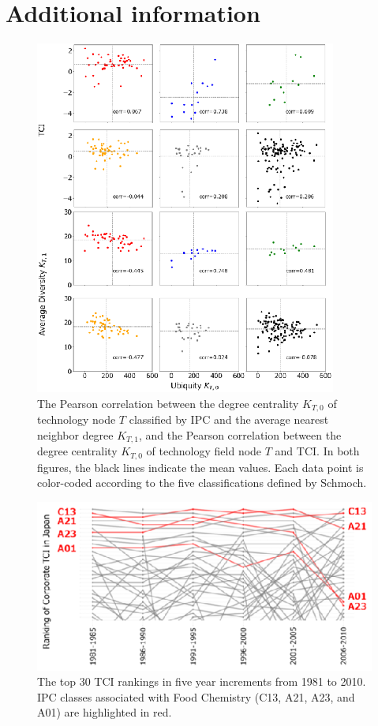 \section*{Additional information}
{}

\renewcommand{\thefigure}{S\arabic{figure}}
\setcounter{figure}{0}

\begin{figure}[ht]
    \centering
    \includegraphics[scale=3.50]{Figs/FigA1.eps}
    \caption{The Pearson correlation between the degree centrality \( K_{T,0} \) of technology node \( T \) classified by IPC and the average nearest neighbor degree \( K_{T,1} \), and the Pearson correlation between the degree centrality \( K_{T,0} \) of technology field node \( T \) and TCI. In both figures, the black lines indicate the mean values. Each data point is color-coded according to the five classifications defined by Schmoch\cite{Schmoch2008}.}
    \label{fig:persector}
\end{figure}

\begin{figure}[ht]
    \centering
    \includegraphics[scale=2.50]{Figs/FigA2.eps}
    \caption{The top 30 TCI rankings in five year increments from 1981 to 2010. IPC classes associated with Food Chemistry (C13, A21, A23, and A01) are highlighted in red.}
    \label{fig:bump}
\end{figure}

